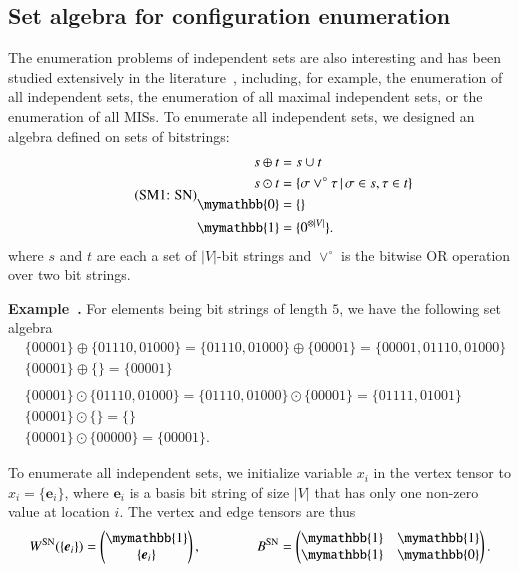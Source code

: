 \documentclass[onefignum, onetabnum]{siamart190516}
\newcommand{\eqname}[1]{\stepcounter{equation}\tag{\theequation : #1}}
\newcommand{\<}{\langle}
\renewcommand{\>}{\rangle}
\newcounter{example}
\newenvironment{example}[1][]{\refstepcounter{example}\par\medskip
   \noindent \textbf{Example~\theexample. #1} \rmfamily}{\medskip}
\begin{document}
\subsection{Set algebra for configuration enumeration}
The enumeration problems of independent sets are also interesting and has been studied extensively in the literature~\cite{Bron1973, Eppstein2010, Johnson1988}, including,
for example, the enumeration of all independent sets, the enumeration of all maximal independent sets, or the enumeration of all MISs.
To enumerate all independent sets, we designed an algebra defined on sets of bitstrings:
\begin{equation}
\eqname{SN}
\begin{split}
    s \oplus t &= s \cup t\\
    s \odot t &= \{\sigma \lor^\circ \tau \, | \, \sigma \in s, \tau \in t\}\\
    \mymathbb{0} &= \{\}\\
    \mymathbb{1} &= \{0^{\otimes |V|}\}.
\end{split}\label{eq:set}
\end{equation}
where $s$ and $t$ are each a set of $|V|$-bit strings and $\lor^\circ$ is the bitwise OR operation over two bit strings.
\begin{example}\label{eg:setalgebra}
    For elements being bit strings of length $5$, we have the following set algebra
\begin{equation*}
\begin{split}
    &\{00001\} \oplus \{01110, 01000\} = \{01110, 01000\} \oplus \{00001\} = \{00001,01110, 01000\}\\
    &\{00001\} \oplus \{\} = \{00001\}\\
&\\
    &\{00001\} \odot \{01110, 01000\} = \{01110, 01000\} \odot \{00001\} = \{01111, 01001\}\\
    &\{00001\} \odot \{\} = \{\}\\
    &\{00001\} \odot \{00000\} = \{00001\}.
\end{split}
\end{equation*}
\end{example}

To enumerate all independent sets, 
we initialize variable $x_{i}$ in the vertex tensor to $x_i = \{\boldsymbol{e}_{i}\}$, where $\boldsymbol{e}_i$ is a basis bit string of size $|V|$ that has only one non-zero value at location $i$.
The vertex and edge tensors are thus
\begin{equation}
    W^{\rm SN}(\{\boldsymbol{e}_{i}\}) = \left(\begin{matrix}
        \mymathbb{1} \\
        \{\boldsymbol{e}_{i}\}
    \end{matrix}\right),   
    \qquad \qquad
        B^{\rm SN} = \left(\begin{matrix}
        \mymathbb{1}  & \mymathbb{1} \\
        \mymathbb{1} & \mymathbb{0}
    \end{matrix}\right).
\end{equation}
\end{document}
